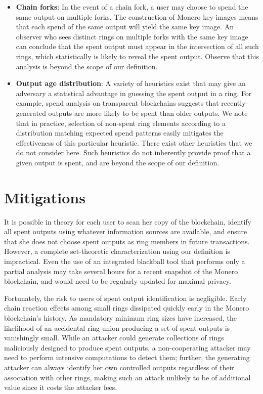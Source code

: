 \documentclass{mrl}
\begin{document}
\begin{itemize}
\item \textbf{Chain forks}: In the event of a chain fork, a user may choose to spend the same output on multiple forks. The construction of Monero key images means that each spend of the same output will yield the same key image. An observer who sees distinct rings on multiple forks with the same key image can conclude that the spent output must appear in the intersection of all such rings, which statistically is likely to reveal the spent output. Observe that this analysis is beyond the scope of our definition.
\item \textbf{Output age distribution}: A variety of heuristics exist that may give an adversary a statistical advantage in guessing the spent output in a ring. For example, spend analysis on transparent blockchains suggests that recently-generated outputs are more likely to be spent than older outputs. We note that in practice, selection of non-spent ring elements according to a distribution matching expected spend patterns easily mitigates the effectiveness of this particular heuristic. There exist other heuristics that we do not consider here. Such heuristics do not inherently provide proof that a given output is spent, and are beyond the scope of our definition. 
\end{itemize}

\section{Mitigations}
It is possible in theory for each user to scan her copy of the blockchain, identify all spent outputs using whatever information sources are available, and ensure that she does not choose spent outputs as ring members in future transactions. However, a complete set-theoretic characterization using our definition is impractical. Even the use of an integrated blackball tool that performs only a partial analysis may take several hours for a recent snapshot of the Monero blockchain, and would need to be regularly updated for maximal privacy.

Fortunately, the risk to users of spent output identification is negligible. Early chain reaction effects among small rings dissipated quickly early in the Monero blockchain's history. As mandatory minimum ring sizes have increased, the likelihood of an accidental ring union producing a set of spent outputs is vanishingly small. While an attacker could generate collections of rings maliciously designed to produce spent outputs, a non-cooperating attacker may need to perform intensive computations to detect them; further, the generating attacker can always identify her own controlled outputs regardless of their association with other rings, making such an attack unlikely to be of additional value since it costs the attacker fees.
\end{document}
